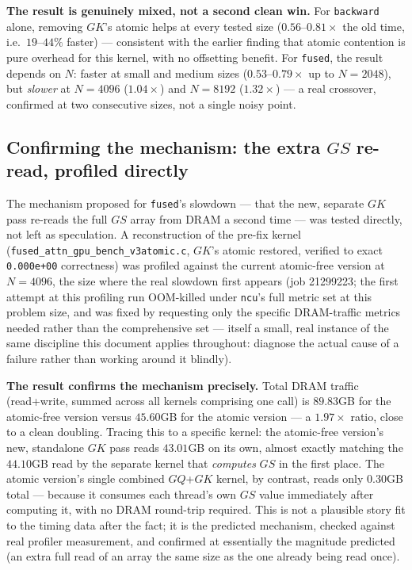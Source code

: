 \documentclass[11pt]{article}
\begin{document}
\textbf{The result is genuinely mixed, not a second clean win.} For
\texttt{backward} alone, removing $GK$'s atomic helps at every tested
size ($0.56$--$0.81\times$ the old time, i.e.\ $19$--$44\%$ faster) ---
consistent with the earlier finding that atomic contention is pure
overhead for this kernel, with no offsetting benefit. For
\texttt{fused}, the result depends on $N$: faster at small and medium
sizes ($0.53$--$0.79\times$ up to $N{=}2048$), but \emph{slower} at
$N{=}4096$ ($1.04\times$) and $N{=}8192$ ($1.32\times$) --- a real
crossover, confirmed at two consecutive sizes, not a single noisy
point.

\subsection{Confirming the mechanism: the extra $GS$ re-read, profiled directly}
\label{sec:paper2-gk-mechanism}

The mechanism proposed for \texttt{fused}'s slowdown --- that the new,
separate $GK$ pass re-reads the full $GS$ array from DRAM a second
time --- was tested directly, not left as speculation. A reconstruction
of the pre-fix kernel (\texttt{fused\_attn\_gpu\_bench\_v3atomic.c},
$GK$'s atomic restored, verified to exact \texttt{0.000e+00}
correctness) was profiled against the current atomic-free version at
$N{=}4096$, the size where the real slowdown first appears (job
21299223; the first attempt at this profiling run OOM-killed under
\texttt{ncu}'s full metric set at this problem size, and was fixed by
requesting only the specific DRAM-traffic metrics needed rather than
the comprehensive set --- itself a small, real instance of the same
discipline this document applies throughout: diagnose the actual cause
of a failure rather than working around it blindly).

\textbf{The result confirms the mechanism precisely.} Total DRAM
traffic (read+write, summed across all kernels comprising one call) is
$89.83$GB for the atomic-free version versus $45.60$GB for the
atomic version --- a $1.97\times$ ratio, close to a clean doubling.
Tracing this to a specific kernel: the atomic-free version's new,
standalone $GK$ pass reads $43.01$GB on its own, almost exactly
matching the $44.10$GB read by the separate kernel that
\emph{computes} $GS$ in the first place. The atomic version's single
combined $GQ$+$GK$ kernel, by contrast, reads only $0.30$GB total ---
because it consumes each thread's own $GS$ value immediately after
computing it, with no DRAM round-trip required. This is not a
plausible story fit to the timing data after the fact; it is the
predicted mechanism, checked against real profiler measurement, and
confirmed at essentially the magnitude predicted (an extra full read
of an array the same size as the one already being read once).
\end{document}
